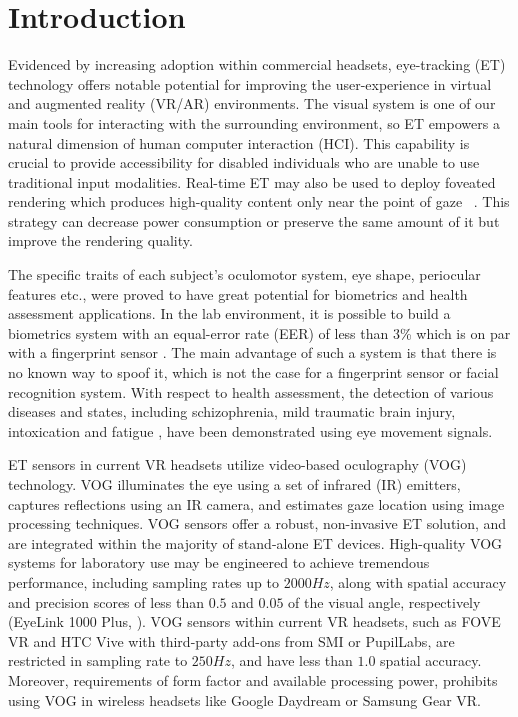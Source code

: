 \section{Introduction}\label{sec:intro}

Evidenced by increasing adoption within commercial headsets, eye-tracking (ET) technology offers notable potential for improving the user-experience in virtual and augmented reality (VR/AR) environments. The visual system is one of our main tools for interacting with the surrounding environment, so ET empowers a natural dimension of human computer interaction (HCI). This capability is crucial to provide accessibility for disabled individuals who are unable to use traditional input modalities. Real-time ET may also be used to deploy foveated rendering which produces high-quality content only near the point of gaze  ~\cite{guenter2012foveated}. This strategy can decrease power consumption or preserve the same amount of it but improve the rendering quality.

The specific traits of each subject's oculomotor system, eye shape, periocular features etc., were proved to have great potential for biometrics and health assessment applications. In the lab environment, it is possible to build a biometrics system with an equal-error rate (EER) of less than $3$\% which is on par with a fingerprint sensor \cite{friedman2017method}. The main advantage of such a system is that there is no known way to spoof it, which is not the case for a fingerprint sensor or facial recognition system. With respect to health assessment, the detection of various diseases and states, including schizophrenia, mild traumatic brain injury, intoxication and fatigue , have been demonstrated using eye movement signals.

ET sensors in current VR headsets utilize video-based oculography (VOG) technology. VOG illuminates the eye using a set of infrared (IR) emitters, captures reflections using an IR camera, and estimates gaze location using image processing techniques. VOG sensors offer a robust, non-invasive ET solution, and are integrated within the majority of stand-alone ET devices. High-quality VOG systems for laboratory use may be engineered to achieve tremendous performance, including sampling rates up to $2000 Hz$, along with spatial accuracy and precision scores of less than $0.5$\textdegree{} and $0.05$\textdegree{} of the visual angle, respectively  (EyeLink 1000 Plus, \cite{EyeLink1000P}). VOG sensors within current VR headsets, such as FOVE VR and HTC Vive with third-party add-ons from SMI or PupilLabs, are restricted in sampling rate to $250 Hz$, and have less than $1.0$\textdegree{} spatial accuracy. Moreover, requirements of form factor and available processing power, prohibits using VOG in wireless headsets like Google Daydream or Samsung Gear VR.

